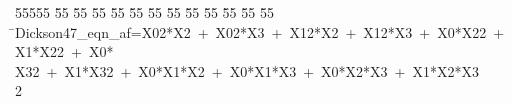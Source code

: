 %
%
\begin{tabbing}
55555 \= 55 \= 55 \= 55 \= 55 \= 55 \= 55 \= 55 \= 55 \= 55 \= 55 \= 55 \= 55 \= \>Dickson47\_eqn\_af=X02*X2\ +\ X02*X3\ +\ X12*X2\ +\ X12*X3\ +\ X0*X22\ +\ X1*X22\ +\ X0*\\[0pt]
\>X32\ +\ X1*X32\ +\ X0*X1*X2\ +\ X0*X1*X3\ +\ X0*X2*X3\ +\ X1*X2*X3\\[0pt]
2\>\end{tabbing}
